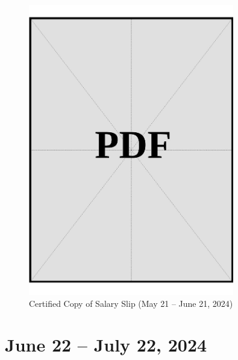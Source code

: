 \begin{figure}[h]
    \centering
    \includegraphics[page=1, width=0.8\textwidth]{../docs/applicant/funds/salary-slips/month-1/certified-copies.pdf}
    \caption{Certified Copy of Salary Slip (May 21 – June 21, 2024)}
    \label{fig:month-1-certified}
\end{figure}

\vspace*{\fill}
\clearpage

\section*{June 22 – July 22, 2024}

